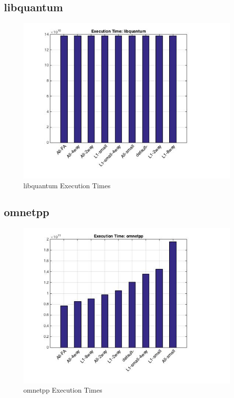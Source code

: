 \documentclass[11pt,titlepage]{article}
\begin{document}
    \subsection{libquantum}
        \begin{figure}[H]
            \centering
            \includegraphics[scale=0.75]{etlibquantum}
            \caption{libquantum Execution Times}
            \label{fig:etlibquantum}
        \end{figure}

    \subsection{omnetpp}
        \begin{figure}[H]
            \centering
            \includegraphics[scale=0.75]{etomnetpp}
            \caption{omnetpp Execution Times}
            \label{fig:etomnetpp}
        \end{figure}
\end{document}
